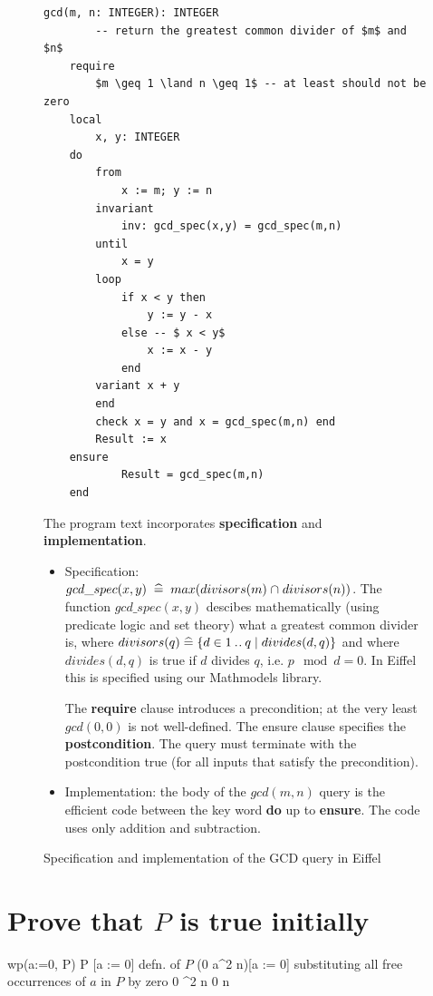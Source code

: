 \documentclass[runningheads,12pt]{article}
\begin{document}

\begin{figure}[!htb]
\begin{framed}
\caption{Specification and implementation of the GCD query in Eiffel}
\label{fig:gcd}
\lstset{language=eiffel}    
\begin{lstlisting} 
gcd(m, n: INTEGER): INTEGER
		-- return the greatest common divider of $m$ and $n$
	require
		$m \geq 1 \land n \geq 1$ -- at least should not be zero
	local
		x, y: INTEGER
	do
		from
			x := m; y := n
		invariant 
			inv: gcd_spec(x,y) = gcd_spec(m,n)
		until
			x = y
		loop
			if x < y then
				y := y - x
			else -- $ x < y$
				x := x - y
			end
		variant x + y
		end
		check x = y and x = gcd_spec(m,n) end
		Result := x
	ensure 
			Result = gcd_spec(m,n)
	end
\end{lstlisting}
The program text incorporates \textbf{specification} and \textbf{implementation}. 
\begin{itemize}
\item Specification: $gcd\_spec(x,y) \;\mathrel{\widehat=}\; max(divisors(m) \mathbin{\mkern1mu\cap\mkern1mu} divisors(n))$.  The function $gcd\_spec(x,y)$ descibes mathematically (using predicate logic and set theory) what a greatest common divider is, where $divisors(q) \mathrel{\widehat=} \{d \in 1 \mathbin{.\mkern1mu.} q \mid divides(d, q)\}$ and where $divides(d, q)$ is true if $d$ divides $q$, i.e. $p \mod d = 0$. In Eiffel this is specified using our Mathmodels library.

The \textbf{require} clause introduces a precondition; at the very least $gcd(0,0)$ is not well-defined. The ensure clause specifies the \textbf{postcondition}. The query must terminate with the postcondition true (for all inputs that satisfy the precondition).

\item Implementation: the body of the $gcd(m,n)$ query is the efficient code between the key word \textbf{do} up to \textbf{ensure}. The code uses only addition and subtraction. 
\end{itemize}
\end{framed}
\end{figure}

\section{ Prove that $P$ is true initially}
	
\begin{calculation}
	wp(a:=0, P)
	P [a := 0]
\hint{=} {defn. of $P$}
	(0 \leq a^2 \leq n)[a := 0]
\hint{=} {substituting all free occurrences of $a$ in $P$ by zero}
	0 ^2 \leq n
	0 \leq n
\end{calculation}
\end{document}
